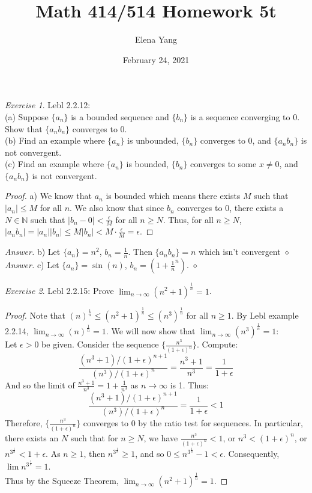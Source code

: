\documentclass[12pt,oneside]{amsart}
\title{Math 414/514 Homework 5t}
\author{Elena Yang}
\date{February 24, 2021}
\theoremstyle{definition}
\theoremstyle{remark}
\newtheorem{exer}{Exercise}
\numberwithin{equation}{exer}
\newenvironment{answer}{\bigskip\noindent\emph{Answer.}}{\hfill$\diamond$\newline}
\begin{document}
\maketitle
\begin{exer}
Lebl 2.2.12: \\
(a) Suppose $\{a_n\}$ is a bounded sequence and $\{b_n\}$ is a sequence converging to 0. Show that $\{a_nb_n\}$ converges to 0. \\
(b) Find an example where $\{a_n\}$ is unbounded, $\{b_n\}$ converges to 0, and $\{a_nb_n\}$ is not convergent. \\
(c) Find an example where $\{a_n\}$ is bounded, $\{b_n\}$ converges to some $x\neq 0$, and $\{a_nb_n\}$ is not convergent.
\end{exer}
\begin{proof}
a) We know that $a_n$ is bounded which means there exists $M$ such that $|a_n|\leq M$ for all $n$. We also know that since $b_n$ converges to $0$, there exists a $N\in \mathbb{N}$ such that $|b_n-0|<\frac{\epsilon}{M}$ for all $n\geq N$. Thus, for all $n\geq N$, $|a_nb_n|=|a_n||b_n|\leq M|b_n|<M\cdot \frac{\epsilon}{M}=\epsilon$. 

\end{proof}
\begin{answer}
b) Let $\{a_n\}=n^2$, $b_n=\frac{1}{n}$. Then $\{a_nb_n\}=n$ which isn't convergent
\end{answer}
\begin{answer}
c) Let $\{a_n\}=\sin(n)$, $b_n=(1+\frac{1}{n}^n)$. 
\end{answer}

\newpage
\begin{exer}
Lebl 2.2.15: Prove $\lim_{n\to\infty}(n^2+1)^\frac{1}{n}=1$.
\end{exer}
\begin{proof}
Note that $(n)^\frac{1}{n}\leq(n^2+1)^\frac{1}{n}\leq(n^3)^\frac{1}{n}$ for all $n\geq 1$. By Lebl example 2.2.14, $\lim_{n\to\infty}(n)^\frac{1}{n}=1$. We will now show that $\lim_{n\to\infty}(n^3)^\frac{1}{n}=1$: \\
Let $\epsilon>0$ be given. Consider the sequence $\{\frac{n^3}{(1+\epsilon)^n}\}$. Compute:
$$\frac{(n^3+1)/(1+\epsilon)^{n+1}}{(n^3)/(1+\epsilon)^n}=\frac{n^3+1}{n^3}=\frac{1}{1+\epsilon}$$
And so the limit of $\frac{n^3+1}{n^3}=1+\frac{1}{n^3}$ as $n\to\infty$ is 1. Thus:
$$\frac{(n^3+1)/(1+\epsilon)^{n+1}}{(n^3)/(1+\epsilon)^n}=\frac{1}{1+\epsilon}<1$$
Therefore, $\{\frac{n^3}{(1+\epsilon)^n}\}$ converges to 0 by the ratio test for sequences. In particular, there exists an $N$ such that for $n\geq N$, we have $\frac{n^3}{(1+\epsilon)^n}<1$, or $n^3<(1+\epsilon)^n$, or $n^{3^{\frac{1}{n}}}<1+\epsilon$. As $n\geq 1$, then $n^{3^{\frac{1}{n}}}\geq 1$, and so $0\leq n^{3^{\frac{1}{n}}}-1<\epsilon$. Consequently, $\lim n^{3^{\frac{1}{n}}}=1$. \\
Thus by the Squeeze Theorem, $\lim_{n\to\infty}(n^2+1)^\frac{1}{n}=1$.
\end{proof}
\end{document}
